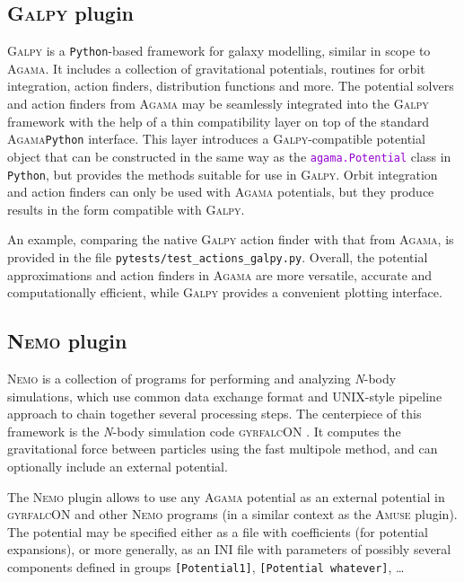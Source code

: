 \documentclass[12pt]{article}
\newcommand{\Agama}{\textsc{Agama}\xspace}
\newcommand{\Amuse}{\textsc{Amuse}\xspace}
\newcommand{\Galpy}{\textsc{Galpy}\xspace}
\newcommand{\Nemo} {\textsc{Nemo}\xspace}
\newcommand{\Nbody}{\textsl{N}-body\xspace}
\newcommand{\Python}{\texttt{Python}\xspace}
\newcommand{\ttt}[1]{\textcolor{darkviolet}{\texttt{#1}}}
\newcommand{\ppp}[1]{\textcolor{darkolive} {\texttt{#1}}}
\begin{document}
\subsection{\Galpy plugin}  \label{sec:Galpy}

\Galpy \cite{Bovy2015} is a \Python-based framework for galaxy modelling, similar in scope to \Agama. It includes a collection of gravitational potentials, routines for orbit integration, action finders, distribution functions and more. 
The potential solvers and action finders from \Agama may be seamlessly integrated into the \Galpy framework with the help of a thin compatibility layer on top of the standard \Agama \Python interface. This layer introduces a \Galpy-compatible potential object that can be constructed in the same way as the \ttt{agama.Potential} class in \Python, but provides the methods suitable for use in \Galpy. Orbit integration and action finders can only be used with \Agama potentials, but they produce results in the form compatible with \Galpy. 

An example, comparing the native \Galpy action finder with that from \Agama, is provided in the file \texttt{pytests/test_actions_galpy.py}. Overall, the potential approximations and action finders in \Agama are more versatile, accurate and computationally efficient, while \Galpy provides a convenient plotting interface.

\subsection{\Nemo plugin}  \label{sec:Nemo}

\Nemo \cite{Teuben1995} is a collection of programs for performing and analyzing \Nbody simulations, which use common data exchange format and UNIX-style pipeline approach to chain together several processing steps. The centerpiece of this framework is the \Nbody simulation code \textsc{gyrfalcON} \cite{Dehnen2000}. It computes the gravitational force between particles using the fast multipole method, and can optionally include an external potential.

The \Nemo plugin allows to use any \Agama potential as an external potential in \textsc{gyrfalcON} and other \Nemo programs (in a similar context as the \Amuse plugin). The potential may be specified either as a file with coefficients (for potential expansions), or more generally, as an INI file with parameters of possibly several components defined in groups \ppp{[Potential1]}, \ppp{[Potential whatever]}, \dots
\end{document}
